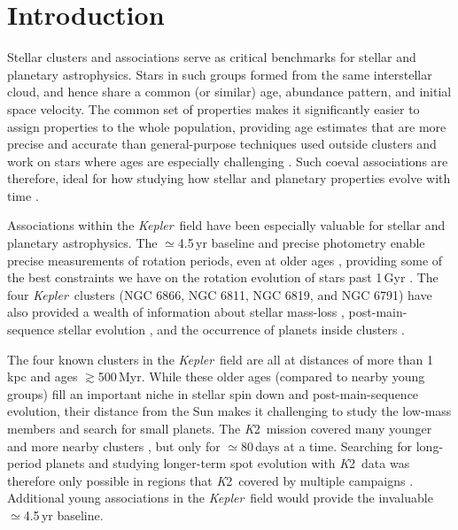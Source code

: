 \documentclass[twocolumn]{aastex631}
\newcommand{\kepler}{{\it Kepler}}
\newcommand{\ktwo}{{\textit K2}}
\begin{document}
\section{Introduction}\label{sec:intro}
Stellar clusters and associations serve as critical benchmarks for stellar and planetary astrophysics. Stars in such groups formed from the same interstellar cloud, and hence share a common (or similar) age, abundance pattern, and initial space velocity. The common set of properties makes it significantly easier to assign properties to the whole population, providing age estimates that are more precise and accurate than general-purpose techniques used outside clusters \citep[e.g., Gyrochronology;][]{2007ApJ...669.1167B, vanSaders2016} and work on stars where ages are especially challenging \citep[e.g., M dwarfs;][]{2021arXiv210401232K}. Such coeval associations are therefore, ideal for how studying how stellar and planetary properties evolve with time \citep{2019ARA&A..57..227K, Mann2016b}. 

Associations within the \kepler\ field have been especially valuable for stellar and planetary astrophysics. The $\simeq$4.5\,yr baseline and precise photometry enable precise measurements of rotation periods, even at older ages \citep[e.g.,][]{Angus2015, Aigrain2015}, providing some of the best constraints we have on the rotation evolution of stars past 1\,Gyr \citep{2011ApJ...733L...9M, Curtis_stall}. The four \kepler\ clusters (NGC 6866, NGC 6811, NGC 6819, and NGC 6791) have also provided a wealth of information about stellar mass-loss \citep{2012MNRAS.419.2077M}, post-main-sequence stellar evolution \citep{2012ApJ...757..190C}, and the occurrence of planets inside clusters \citep{Meibom2013}.  

The four known clusters in the \kepler\ field are all at distances of more than 1\,kpc and ages $\gtrsim$500\,Myr. While these older ages (compared to nearby young groups) fill an important niche in stellar spin down and post-main-sequence evolution, their distance from the Sun makes it challenging to study the low-mass members and search for small planets. The \ktwo\ mission covered many younger and more nearby clusters \citep{VanCleve2016, Rizzuto2017}, but only for $\simeq$80\,days at a time. Searching for long-period planets and studying longer-term spot evolution with \ktwo\ data was therefore only possible in regions that \ktwo\ covered by multiple campaigns \citep{2021arXiv210613250R}. Additional young associations in the \kepler\ field would provide the invaluable $\simeq$4.5\,yr baseline.
\end{document}
